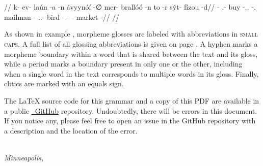 	\begingl
		\glpreamble {}\\
		\\
		//
		\gla k- ev- laún -a -n ávyynóí -∅ mer- brallóó -n to -r sýt- fízou -d//
		\glb \Neg- \Act.\Opt- buy -\At.\Dir.\Tps{} -\Idr.\Tps{} mailman -\Dir{} \Fps.\Poss.\Ali- bird -\Idr{} \Sps{} -\Ben{} \Dim- market -\Loc//
		\glft {}//
	\endgl
\xe

As shown in example , morpheme glosses are labeled with abbreviations in \textsc{small caps}. A full list of all glossing abbreviations is given on page \pageref{cha:glossary}. A hyphen marks a morpheme boundary within a word that is shared between the text and its gloss, while a period marks a boundary present in only one or the other, including when a single word in the text corresponds to multiple words in its gloss. Finally, clitics are marked with an equals sign.

The \LaTeX{} source code for this grammar and a copy of this PDF are available in a public \href{https://github.com/nai888/tadoni-grammar}{\faGithub~GitHub} repository. Undoubtedly, there will be errors in this document. If you notice any, please feel free to open an issue in the GitHub repository with a description and the location of the error.

\begin{flushright}
	\makeatletter
	\textit{\@author}\\
	\textit{Minneapolis, }
	\makeatother
\end{flushright}